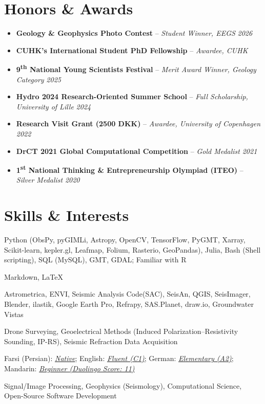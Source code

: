 \documentclass[letterpaper,10pt]{article}
\begin{document}
		\vspace{-0.95em}
	
	\section{Honors \& Awards}
\begin{itemize}[left=0pt, label={}, topsep=1pt, partopsep=0pt, itemsep=1.5pt, parsep=0pt]
	\item \textbf{Geology \& Geophysics Photo Contest} -- \textit{Student Winner, EEGS} \hfill \textit{2026}
	\item \textbf{CUHK's International Student PhD Fellowship} -- \textit{Awardee, CUHK} \hfill
	\item \textbf{9\textsuperscript{th} National Young Scientists Festival} -- \textit{Merit Award Winner, Geology Category} \hfill \textit{2025}
	\item \textbf{Hydro 2024 Research-Oriented Summer School} -- \textit{Full Scholarship, University of Lille} \hfill \textit{2024}
	\item \textbf{Research Visit Grant (2500 DKK)} -- \textit{Awardee, University of Copenhagen} \hfill \textit{2022}
	\item \textbf{DrCT 2021 Global Computational Competition} -- \textit{Gold Medalist} \hfill \textit{2021}
	\item \textbf{1\textsuperscript{st} National Thinking \& Entrepreneurship Olympiad (ITEO)} -- \textit{Silver Medalist} \hfill \textit{2020}
\end{itemize}
	
		\vspace{-0.95em}
	
	\section{Skills \& Interests}
	\begin{description}[itemsep=0pt, topsep=1pt, parsep=0pt, partopsep=0pt]
		\item[Programming Languages:] Python (ObsPy, pyGIMLi, Astropy, OpenCV, TensorFlow, PyGMT, Xarray, Scikit-learn, kepler.gl, Leafmap, Folium, Rasterio, GeoPandas), Julia, Bash (Shell scripting), SQL (MySQL), GMT, GDAL; Familiar with R
		\item[Markup Languages:] Markdown, \LaTeX
		\item[Softwares:] Astrometrica, ENVI, Seismic Analysis Code(SAC), SeisAn, QGIS, SeisImager, Blender, ilastik, Google Earth Pro, Refrapy, SAS.Planet, draw.io, Groundwater Vistas
		\item[Field Techniques:] Drone Surveying, Geoelectrical Methods (Induced Polarization–Resistivity Sounding, IP-RS), Seismic Refraction Data Acquisition
		\item[Languages:] Farsi (Persian): \textit{\underline{Native}}; English: \textit{\underline{Fluent (C1)}}; German: \textit{\underline{Elementary (A2)}}; Mandarin: \textit{\underline{Beginner (Duolingo Score: 11)}}
		\item[Research Interests:] Signal/Image Processing, Geophysics (Seismology), Computational Science, Open-Source Software Development
	\end{description}
	
\end{document}
